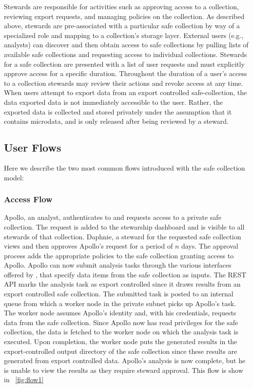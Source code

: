 Stewards are responsible for activities such as approving access to a collection, reviewing
export requests, and managing policies on the collection.
As described above, stewards are pre-associated with a particular safe collection by
way of a specialized role and mapping to a collection's storage layer.
External users (e.g., analysts) can discover
and then obtain access to safe collections by pulling lists of available safe collections and requesting
access to individual collections.
Stewards for a safe collection are presented with a list of user requests and must explicitly approve access
for a specific duration. Throughout the duration of a user's access to a collection
stewards may review their actions and revoke access at any time. When users attempt
to export data from an export controlled safe-collection, the data exported data is not immediately
accessible to the user. Rather, the exported data is collected and stored privately under the assumption that it contains microdata, and is only released after being reviewed by a steward.


\subsection{User Flows}

Here we describe the two most common flows introduced with the safe collection model:

\subsubsection{Access Flow}

Apollo, an analyst, authenticates to \NAME and requests access to a private safe collection.
The request is added to the stewarship dashboard and is visible to all stewards
of that collection. Daphnie, a steward for the requested
safe collection views and then approves Apollo's request for a period of $n$ days.
The approval process adds the appropriate policies to the
safe collection granting access to Apollo. Apollo can now submit analysis tasks through the various
interfaces offered by \NAME, that specify data items from the safe collection as inputs.
The REST API marks the analysis task as export controlled since it draws results
from an export controlled safe collection.
The submitted task is posted to an internal queue from which a
worker node in the \NAME private subnet picks up Apollo's task. The worker node assumes Apollo's identity and, with
his credentials, requests data from the safe collection. Since Apollo now has read privileges for the
safe collection, the data is fetched to the worker node on which the analysis task is executed.
Upon completion, the worker node puts the generated results in the export-controlled
output directory of the safe collection since these results are generated from export controlled data.
Apollo's analysis is now complete, but he is unable to view the
results as they require steward approval. This flow is show in \figurename~\ref{fig:flow1}

